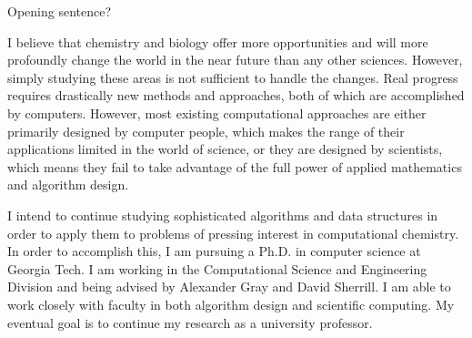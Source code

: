 \documentclass[twoside,leqno, 12pt]{article}
\begin{document}

%




Opening sentence?

I believe that chemistry and biology offer more opportunities and will more profoundly change the world in the near future than any other sciences.  However, simply studying these areas is not sufficient to handle the changes.  Real progress requires drastically new methods and approaches, both of which are accomplished by computers.  However, most existing computational approaches are either primarily designed by computer people, which makes the range of their applications limited in the world of science, or they are designed by scientists, which means they fail to take advantage of the full power of applied mathematics and algorithm design.

I intend to continue studying sophisticated algorithms and data structures in order to apply them to problems of pressing interest in computational chemistry.  In order to accomplish this, I am pursuing a Ph.D. in computer science at Georgia Tech.  I am working in the Computational Science and Engineering Division and being advised by Alexander Gray and David Sherrill.  I am able to work closely with faculty in both algorithm design and scientific computing.  My eventual goal is to continue my  research as a university professor. 

\end{document}
